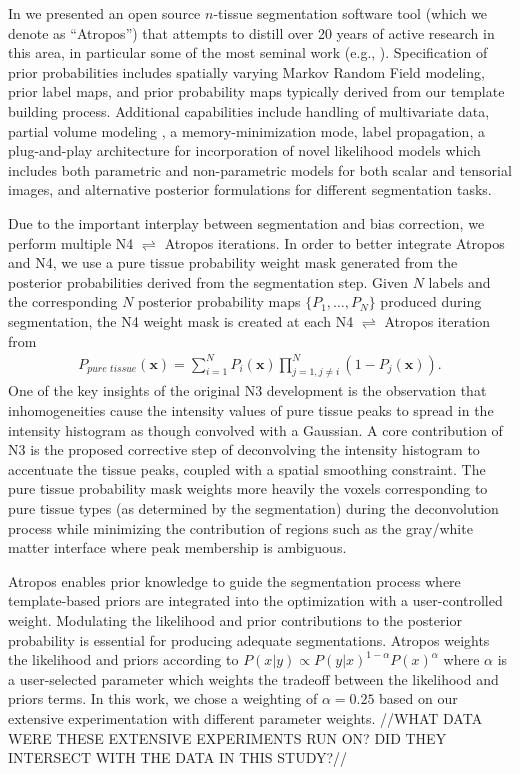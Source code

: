 In \cite{avants2011a} we presented an open source $n$-tissue segmentation software tool
(which we denote as ``Atropos'') that attempts to distill over 20 years of active research in this area,
in particular some of the most seminal work (e.g., \cite{zhang2001,ashburner2005}).
Specification of prior probabilities includes spatially varying Markov Random Field modeling, 
prior label maps, and prior probability maps typically derived from our template building 
process.  Additional
capabilities include handling of multivariate data, 
partial volume modeling \citep{shattuck2001}, a memory-minimization mode,
label propagation, a plug-and-play architecture for incorporation of novel likelihood models
which includes both parametric and non-parametric models for both scalar and tensorial
images, and alternative posterior formulations for different segmentation tasks.

Due to the important interplay between segmentation and bias correction,
we perform multiple N4 $\rightleftharpoons$ Atropos iterations.
In order to better integrate Atropos and N4, we use  
a pure tissue probability weight mask generated from the 
posterior probabilities derived from the segmentation 
step.  Given $N$ labels and the corresponding $N$
posterior probability maps $\{ P_1, \ldots, P_N\}$ produced
during segmentation, the N4 weight mask is 
created at each N4 $\rightleftharpoons$ Atropos iteration from
\begin{align}
  P_{pure\,\,tissue}(\mathbf{x}) = \sum_{i=1}^N P_i(\mathbf{x}) \prod_{j=1, j \neq i}^N \left( 1 - P_j(\mathbf{x}) \right).
\end{align}
One of the key insights of the original N3 development is the
observation that inhomogeneities cause the intensity values of
pure tissue peaks to spread in the intensity histogram as though
convolved with a Gaussian.  A core contribution of N3 is the
proposed corrective step of deconvolving the intensity histogram to
accentuate the tissue peaks, coupled with a spatial smoothing
constraint. The pure tissue probability mask
weights more heavily the voxels corresponding to pure tissue 
types (as determined by the segmentation) during the deconvolution process 
while minimizing the contribution of regions such as the gray/white matter 
interface where peak membership is ambiguous. 

Atropos enables prior knowledge to guide the
segmentation process where template-based priors are integrated into the optimization
with a user-controlled weight.  Modulating the likelihood and prior contributions
to the posterior probability is essential for producing adequate segmentations.
Atropos weights the likelihood and priors according to
$P(x|y) \propto P(y|x)^{1-\alpha}P(x)^{\alpha}$
where $\alpha$ is a user-selected parameter which weights the tradeoff between the likelihood and priors terms.
In this work, we chose a weighting of $\alpha = 0.25$ 
based on our extensive experimentation with different parameter weights.
//WHAT DATA WERE THESE EXTENSIVE EXPERIMENTS RUN ON? DID THEY INTERSECT WITH THE DATA IN THIS STUDY?//


